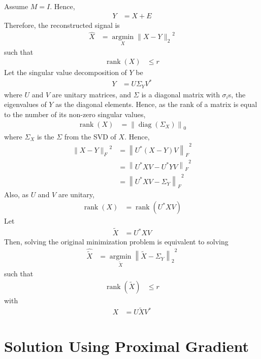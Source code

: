 \documentclass[titlepage, fleqn, a4paper, 12pt, twoside]{article}
\theoremstyle{definition}
\theoremstyle{theorem}
\renewcommand{\tilde}{\widetilde}
\DeclareMathOperator{\argmin}{\mathrm{argmin}}
\DeclareMathOperator{\rank}{\mathrm{rank}}
\DeclareMathOperator{\diag}{\mathrm{diag}}
\begin{document}
Assume $M = I$.
Hence,
\begin{align*}
	Y &= X + E
\end{align*}
Therefore, the reconstructed signal is
\begin{align*}
	\hat{X} &= \argmin\limits_{X} {\|X - Y\|_2}^2
\end{align*}
such that
\begin{align*}
	\rank(X) &\le r
\end{align*}
Let the singular value decomposition of $Y$ be
\begin{align*}
	Y &= U \Sigma_Y V^*
\end{align*}
where $U$ and $V$ are unitary matrices, and $\Sigma$ is a diagonal matrix with $\sigma_i$s, the eigenvalues of $Y$ as the diagonal elements.
Hence, as the rank of a matrix is equal to the number of its non-zero singular values,
\begin{align*}
	\rank(X) &= \left\| \diag(\Sigma_X) \right\|_0
\end{align*}
where $\Sigma_X$ is the $\Sigma$ from the SVD of $X$.
Hence,
\begin{align*}
	{\|X - Y\|_F}^2 &= {\left\| U^* (X - Y) V \right\|_F}^2\\
	&= {\left\| U^* X V - U^* Y V \right\|_F}^2\\
	&= {\left\| U^* X V - \Sigma_Y \right\|_F}^2
\end{align*}
Also, as $U$ and $V$ are unitary,
\begin{align*}
	\rank(X) &= \rank(U^* X V)
\end{align*}
Let
\begin{align*}
	\tilde{X} &= U^* X V
\end{align*}
Then, solving the original minimization problem is equivalent to solving
\begin{align*}
	\hat{\tilde{X}} &= \argmin\limits_{\tilde{X}} {\left\| \tilde{X} - \Sigma_Y \right\|_2}^2
\end{align*}
such that
\begin{align*}
	\rank\left( \tilde{X} \right) &\le r
\end{align*}
with
\begin{align*}
	X &= U \tilde{X} V^*
\end{align*}

\section{Solution Using Proximal Gradient}
\end{document}
